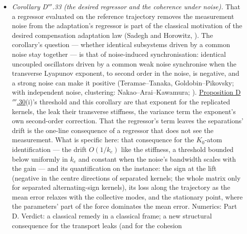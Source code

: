 \begin{itemize}
    extra modes of an isotropic Gaussian mixture need overlapping components (Carreira-Perpi\~n\'an--Williams), which
    (v) uses (\cite{S60}). What is specific here is the combination as a leak in mean-field adaptive control: the
    exact blocks at clustered configurations with the mass factor $\sigma_0w_k$, the gauge-scaled splitting margin
    $\sigma_0w_k - (q_k/w_k)\lambda^+_k$, the twins' contraction rate, and the real loop's periodic lift with the
    separation exponents $\sigma_0w_k/k_e$. The number of kernels is not selected by the leak (Numerics (C), (J),
    (K)). Numerics: . Verdict: classical ingredients; a new prior-free leak on the
    unexcited subspace.
  \item \emph{Corollary D$'''$.33 (the desired regressor and the coherence under noise).} That a regressor evaluated
    on the reference trajectory removes the measurement noise from the adaptation's regressor is part of the
    classical motivation of the desired compensation adaptation law (Sadegh and Horowitz, \cite{S53}). The
    corollary's question --- whether identical subsystems driven by a common noise stay together --- is that of
    noise-induced synchronisation: identical uncoupled oscillators driven by a common weak noise synchronise when the
    transverse Lyapunov exponent, to second order in the noise, is negative, and a strong noise can make it positive
    (Teramae--Tanaka, Goldobin--Pikovsky; with independent noise, clustering: Nakao--Arai--Kawamura; \cite{S61}).
    \hyperref[res:thmDppp:30]{Proposition D$'''$.30}(i)'s threshold and this corollary are that exponent for the
    replicated kernels, the leak their transverse stiffness, the variance term the exponent's own second-order
    correction. That the regressor's term leaves the separations' drift is the one-line consequence of a regressor
    that does not see the measurement. What is specific here: that consequence for the $K_0$-atom identification ---
    the drift $O(1/k_e)$ like the stiffness, a threshold bounded below uniformly in $k_e$ and constant when the
    noise's bandwidth scales with the gain --- and its quantification on the instance: the sign at the lift (negative
    in the centre directions of separated kernels; the whole matrix only for separated alternating-sign kernels), its
    loss along the trajectory as the mean error relaxes with the collective modes, and the stationary point, where the
    parameters' part of the force dominates the mean error. Numerics:  Part D. Verdict: a
    classical remedy in a classical frame; a new structural consequence for the transport leaks (and for the cohesion

\end{itemize}
